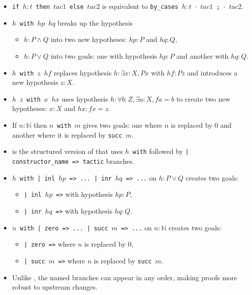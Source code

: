 \documentclass[a4paper]{article}
\newcommand{\N}{\mathbb{N}}
\begin{document}
\begin{itemize}
    \item \texttt{if $h : t$ then $tac1$ else $tac2$} is equivalent to
    \texttt{by\_cases $h : t$ $\cdot$ $tac1$ ; $\cdot$ $tac2$}.
\end{itemize}


\begin{itemize}
    \item \texttt{\casesp $h$ with $hp$ $hq$} breaks up the hypothesis
    \begin{itemize}
        \item $h: P \wedge Q$ into two new hypotheses: $hp:P$ and $hq:Q$,
        \item $h: P \vee Q$ into two goals: one with hypothesis $hp:P$ and another with $hq:Q$.
    \end{itemize}
    \item \texttt{\casesp $h$ with $z$ $hf$} replaces hypothesis $h: \exists x : X, P x$ with $hf: P z$ and introduces a new hypothesis $z : X$.
    \item \texttt{\casesp $h$ $z$ with $x$ $hx$} uses hypothesis $h: \forall b : Z, \exists a : X, f a = b$ to create two new hypotheses: $x : X$ and $hx : f x = z$.
    \item If $n:\N$ then \texttt{\casesp $n$ with $m$} gives two goals: one where $n$ is replaced by $0$ and another where it is replaced by \texttt{succ $m$}.
\end{itemize}


\begin{itemize}
    \item \ccases is the structured version of \casesp that uses \texttt{\ccases $h$ with} followed by \texttt{| constructor\_name => tactic} branches.
    \item \texttt{\ccases $h$ with | inl $hp$ => ... | inr $hq$ => ...} on $h : P \vee Q$ creates two goals:
    \begin{itemize}
        \item \texttt{| inl $hp$ =>} with hypothesis $hp : P$,
        \item \texttt{| inr $hq$ =>} with hypothesis $hq : Q$.
    \end{itemize}
    \item \texttt{\ccases $n$ with | zero => ... | succ $m$ => ...} on $n : \N$ creates two goals:
    \begin{itemize}
        \item \texttt{| zero =>} where $n$ is replaced by $0$,
        \item \texttt{| succ $m$ =>} where $n$ is replaced by \texttt{succ $m$}.
    \end{itemize}
    \item Unlike \casesp, the named branches can appear in any order, making proofs more robust to upstream changes.
\end{itemize}
\end{document}
